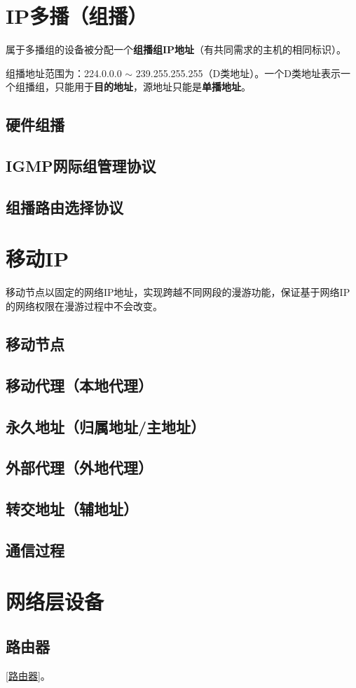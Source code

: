 \section{IP多播（组播）}
属于多播组的设备被分配一个\textbf{组播组IP地址}（有共同需求的主机的相同标识）。

组播地址范围为：224.0.0.0 \(\sim\) 239.255.255.255（D类地址）。一个D类地址表示一个组播组，只能用于\textbf{目的地址}，源地址只能是\textbf{单播地址}。

\subsection{硬件组播}


\subsection{IGMP网际组管理协议}


\subsection{组播路由选择协议}


\section{移动IP}
移动节点以固定的网络IP地址，实现跨越不同网段的漫游功能，保证基于网络IP的网络权限在漫游过程中不会改变。

\subsection{移动节点}


\subsection{移动代理（本地代理）}


\subsection{永久地址（归属地址/主地址）}


\subsection{外部代理（外地代理）}


\subsection{转交地址（辅地址）}


\subsection{通信过程}


\section{网络层设备}

\subsection{路由器}
\ref{路由器}。

